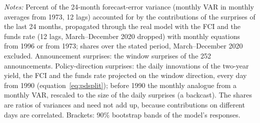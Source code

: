\begin{table}[tp]\centering\small
\caption{Announcement and Policy-Direction Surprises: Variance Shares at 24 Months}\label{tab:decompshares}
\begin{flushleft}\footnotesize\textit{Notes:} Percent of the 24-month forecast-error variance (monthly VAR in monthly averages from 1973, 12 lags) accounted for by the contributions of the surprises of the last 24 months, propagated through the real model with the FCI and the funds rate (12 lags, March--December 2020 dropped) with monthly equations from 1996 or from 1973; shares over the stated period, March--December 2020 excluded. Announcement surprises: the window surprises of the 252 announcements. Policy-direction surprises: the daily innovations of the two-year yield, the FCI and the funds rate projected on the window direction, every day from 1990 (equation~\eqref{eq:pdsplit}); before 1990 the monthly analogue from a monthly VAR, rescaled to the size of the daily surprises (a backcast). The shares are ratios of variances and need not add up, because contributions on different days are correlated. Brackets: 90\% bootstrap bands of the model's responses.\end{flushleft}
\end{table}
